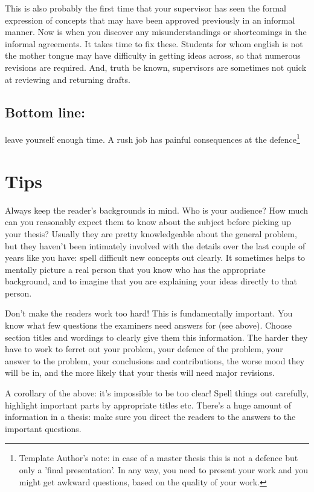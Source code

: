 This is also probably the first time that your supervisor has seen the formal
expression of concepts that may have been approved previously in an informal
manner. Now is when you discover any misunderstandings or shortcomings in the
informal agreements. It takes time to fix these. Students for whom english is
not the mother tongue may have difficulty in getting ideas across, so that
numerous revisions are required. And, truth be known, supervisors are
sometimes not quick at reviewing and returning drafts.

\subsection*{Bottom line:} leave yourself enough time. A rush job has painful consequences
at the defence\footnote{Template Author's note: in case of a master thesis
this is not a defence but only a 'final presentation'. In any way, you need to
present your work and you might get awkward questions, based on the quality of
your work.}

\section{Tips}

Always keep the reader's backgrounds in mind. Who is your audience? How much
can you reasonably expect them to know about the subject before picking up
your thesis? Usually they are pretty knowledgeable about the general problem,
but they haven't been intimately involved with the details over the last
couple of years like you have: spell difficult new concepts out clearly. It
sometimes helps to mentally picture a real person that you know who has the
appropriate background, and to imagine that you are explaining your ideas
directly to that person.

Don't make the readers work too hard! This is fundamentally important. You
know what few questions the examiners need answers for (see above). Choose
section titles and wordings to clearly give them this information. The harder
they have to work to ferret out your problem, your defence of the problem,
your answer to the problem, your conclusions and contributions, the worse mood
they will be in, and the more likely that your thesis will need major
revisions.

A corollary of the above: it's impossible to be too clear! Spell things out
carefully, highlight important parts by appropriate titles etc. There's a huge
amount of information in a thesis: make sure you direct the readers to the
answers to the important questions.

